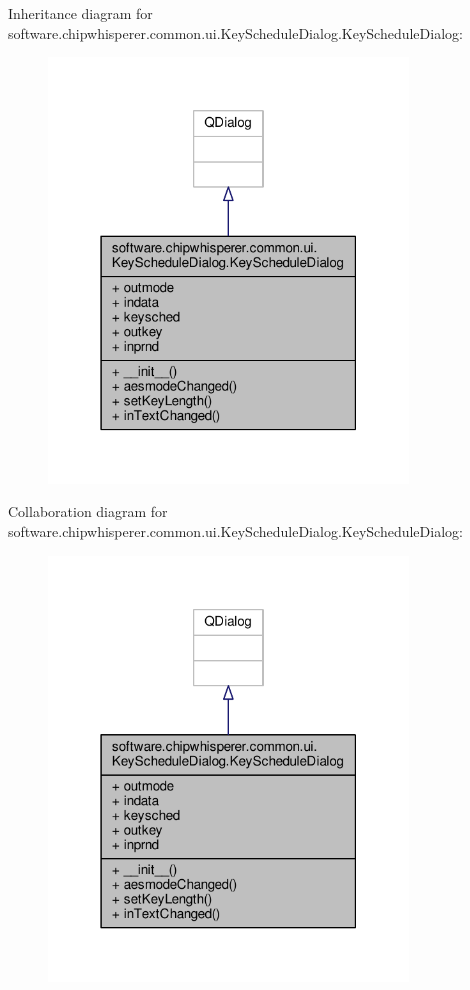 Inheritance diagram for software.\+chipwhisperer.\+common.\+ui.\+Key\+Schedule\+Dialog.\+Key\+Schedule\+Dialog\+:\nopagebreak
\begin{figure}[H]
\begin{center}
\leavevmode
\includegraphics[width=271pt]{d4/d75/classsoftware_1_1chipwhisperer_1_1common_1_1ui_1_1KeyScheduleDialog_1_1KeyScheduleDialog__inherit__graph}
\end{center}
\end{figure}


Collaboration diagram for software.\+chipwhisperer.\+common.\+ui.\+Key\+Schedule\+Dialog.\+Key\+Schedule\+Dialog\+:\nopagebreak
\begin{figure}[H]
\begin{center}
\leavevmode
\includegraphics[width=271pt]{db/da7/classsoftware_1_1chipwhisperer_1_1common_1_1ui_1_1KeyScheduleDialog_1_1KeyScheduleDialog__coll__graph}
\end{center}
\end{figure}


